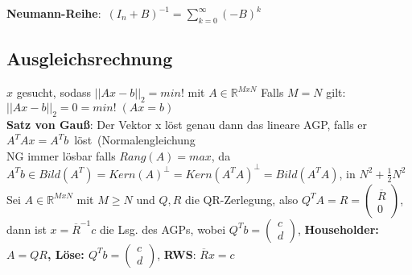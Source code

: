 \mbox{\textbf{Neumann-Reihe}: $(I_n + B)^{-1} = \sum_{k=0}^\infty (-B)^k$}

\subsection{Ausgleichsrechnung}
$x$ gesucht, sodass $||Ax-b||_2 = min!$ mit $A \in \mathbb{R}^{MxN}$
Falls $M=N$ gilt: $||Ax-b||_2 = 0 = min! \;(Ax = b)$\\
\textbf{Satz von Gauß}: Der Vektor x löst genau dann das lineare AGP, falls er \mbox{$A^TAx = A^Tb$ löst (Normalengleichung}\\
NG immer lösbar falls $Rang(A) = max$, da $A^Tb \in Bild(A^T) = Kern(A)^{\bot} = Kern(A^TA)^{\bot} = Bild(A^TA)$, in $N^2 + \frac{1}{2}N^2$\\
Sei $A \in \mathbb{R}^{MxN}$ mit $M \geq N$ und $Q, R$ die QR-Zerlegung, also $Q^TA = R = \begin{pmatrix} \overline{R} \\ 0 \end{pmatrix}$, dann ist $x = \overline{R}^{-1}c$ die Lsg. des AGPs, wobei $Q^Tb = \begin{pmatrix} c \\ d \end{pmatrix}$, \textbf{Householder: $A = QR$,
\textbf{Löse}: $Q^Tb = \begin{pmatrix} c \\ d \end{pmatrix}$}, \textbf{RWS}: $\overline{R}x = c$
